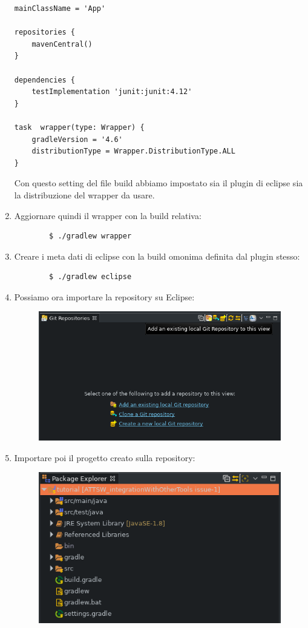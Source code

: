 \begin{enumerate}
\begin{lstlisting}[frame=single]
mainClassName = 'App'

repositories {
    mavenCentral()
}

dependencies {
    testImplementation 'junit:junit:4.12'
}

task  wrapper(type: Wrapper) {
    gradleVersion = '4.6'
    distributionType = Wrapper.DistributionType.ALL
}
    \end{lstlisting}
    Con questo setting del file build abbiamo impostato sia il plugin di eclipse sia la distribuzione del wrapper da usare.
    \item Aggiornare quindi il wrapper con la build relativa:
    \begin{verbatim}
        $ ./gradlew wrapper
    \end{verbatim}
    \item Creare i meta dati di eclipse con la build omonima definita dal plugin stesso:
    \begin{verbatim}
        $ ./gradlew eclipse
    \end{verbatim}
    \item Possiamo ora importare la repository su Eclipse:
    \begin{figure}[H]
    \centering
    \includegraphics[width=0.8\linewidth]{4IntegrationWithOtherTool/tutorial/addExistingLocalGitRepository.png}
    \end{figure}
    \item Importare poi il progetto creato sulla repository:
    \begin{figure}[H]
    \centering
    \includegraphics[width=0.8\linewidth]{4IntegrationWithOtherTool/tutorial/localRepositoryEclipse.png}

\end{figure}
\end{enumerate}
